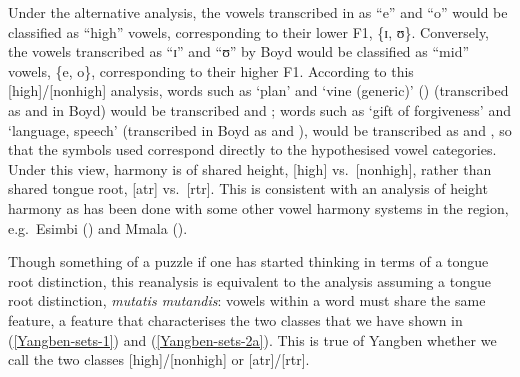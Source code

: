 Under the alternative analysis, the vowels transcribed in \citet{Boyd:2015} as ``e'' and ``o'' would be classified as ``high'' vowels, corresponding to their lower F1,  \{ɪ, ʊ\}. Conversely, the vowels transcribed as ``ɪ'' and ``ʊ'' by Boyd would be classified as ``mid'' vowels,  \{e, o\}, corresponding to their higher F1. According to this [high]/[nonhigh] analysis, words such as `plan' and `vine (generic)' ()  (transcribed as \ipa{[ŋètʲè]} and \ipa{[òŋòl{\í}]} in Boyd) would be transcribed \ipa{[ŋ\`{ɪ}tʲ\`{ɪ}]} and ; words such as `gift of forgiveness' and `language, speech' (transcribed in Boyd as  and ), would be transcribed as  and \ipa{[nòkál]}, so that the symbols used correspond directly to the hypothesised vowel categories.  Under this view, harmony is of shared height, [high] vs.\ [nonhigh], rather than shared tongue root, [atr] vs.\ [rtr]. This is consistent with an analysis of height harmony as has been done with  some other vowel harmony systems in the region, e.g.\ Esimbi (\citealt{Hyman:1988}) and Mmala (\citealt{Boyd:2015}).

Though something of a puzzle if one has started thinking in terms of a tongue root distinction, this reanalysis  is equivalent to the analysis assuming a tongue root distinction, {\it mutatis mutandis}: vowels within a word must share the same feature, a feature that characterises the two classes that we have shown in (\ref{Yangben-sets-1}) and (\ref{Yangben-sets-2a}). This is true of Yangben whether we call the two classes [high]/[nonhigh] or [atr]/[rtr].   


